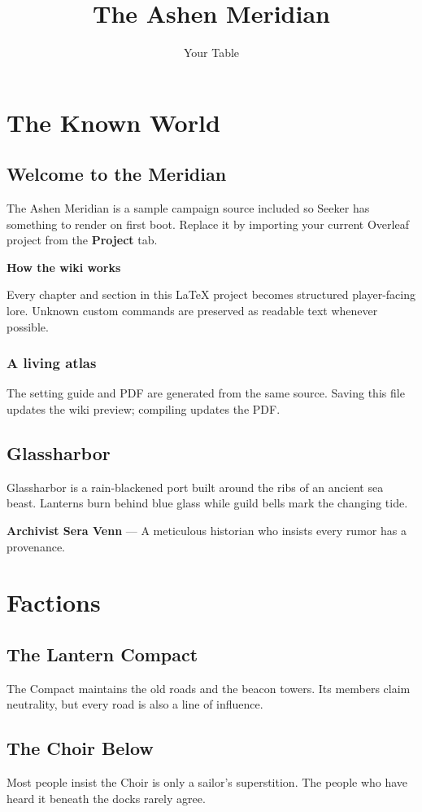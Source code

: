 \documentclass[11pt]{book}
\title{The Ashen Meridian}
\author{Your Table}
\newcommand{\lorebox}[2]{\par\medskip\noindent\textbf{#1}\par #2\par\medskip}
\newcommand{\npc}[2]{\par\noindent\textbf{#1} --- #2\par}
\begin{document}
\maketitle
\tableofcontents

\chapter{The Known World}
\section{Welcome to the Meridian}
The Ashen Meridian is a sample campaign source included so Seeker has something to render on first boot. Replace it by importing your current Overleaf project from the \textbf{Project} tab.

\lorebox{How the wiki works}{Every chapter and section in this LaTeX project becomes structured player-facing lore. Unknown custom commands are preserved as readable text whenever possible.}

\subsection{A living atlas}
The setting guide and PDF are generated from the same source. Saving this file updates the wiki preview; compiling updates the PDF.

\section{Glassharbor}
Glassharbor is a rain-blackened port built around the ribs of an ancient sea beast. Lanterns burn behind blue glass while guild bells mark the changing tide.

\npc{Archivist Sera Venn}{A meticulous historian who insists every rumor has a provenance.}

\chapter{Factions}
\section{The Lantern Compact}
The Compact maintains the old roads and the beacon towers. Its members claim neutrality, but every road is also a line of influence.

\section{The Choir Below}
Most people insist the Choir is only a sailor's superstition. The people who have heard it beneath the docks rarely agree.
\end{document}
